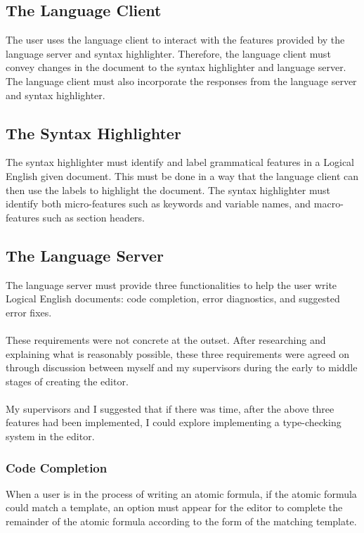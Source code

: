 \documentclass[../main.tex]{subfiles}
\begin{document}
\subsection{The Language Client}
The user uses the language client to interact with the features provided by the language server and syntax highlighter. Therefore, the language client must convey changes in the document to the syntax highlighter and language server. The language client must also incorporate the responses from the language server and syntax highlighter.

\subsection{The Syntax Highlighter}
The syntax highlighter must identify and label grammatical features in a Logical English given document. This must be done in a way that the language client can then use the labels to highlight the document. The syntax highlighter must identify both micro-features such as keywords and variable names, and macro-features such as section headers.

\subsection{The Language Server}
The language server must provide three functionalities to help the user write Logical English documents: code completion, error diagnostics, and suggested error fixes. 
\\ 
\\
These requirements were not concrete at the outset. After researching and explaining what is reasonably possible, these three requirements were agreed on through discussion between myself and my supervisors during the early to middle stages of creating the editor. 
\\
\\
My supervisors and I suggested that if there was time, after the above three features had been implemented, I could explore implementing a type-checking system in the editor.

\subsubsection{Code Completion}
When a user is in the process of writing an atomic formula, if the atomic formula could match a template, an option must appear for the editor to complete the remainder of the atomic formula according to the form of the matching template.
\end{document}
